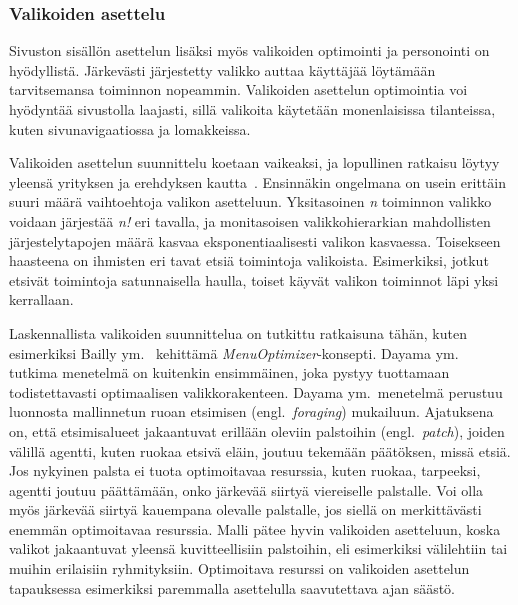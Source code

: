 \documentclass[finnish, 12pt, a4paper, elec, utf8, a-1b]{aaltothesis}
\begin{document}
\subsubsection{Valikoiden asettelu}\label{menu-personalization}

Sivuston sisällön asettelun lisäksi myös valikoiden optimointi ja personointi on
hyödyllistä. Järkevästi järjestetty valikko auttaa käyttäjää löytämään
tarvitsemansa toiminnon nopeammin. Valikoiden asettelun optimointia voi
hyödyntää sivustolla laajasti, sillä valikoita käytetään monenlaisissa
tilanteissa, kuten sivunavigaatiossa ja lomakkeissa.

Valikoiden asettelun suunnittelu koetaan vaikeaksi, ja lopullinen ratkaisu
löytyy yleensä yrityksen ja erehdyksen kautta~\cite{10.1145/2501988.2502024}.
Ensinnäkin ongelmana on usein erittäin suuri määrä vaihtoehtoja valikon
asetteluun. Yksitasoinen \textit{n} toiminnon valikko voidaan järjestää
\textit{n!} eri tavalla, ja monitasoisen valikkohierarkian mahdollisten
järjestelytapojen määrä kasvaa eksponentiaalisesti valikon kasvaessa. Toisekseen
haasteena on ihmisten eri tavat etsiä toimintoja valikoista. Esimerkiksi, jotkut
etsivät toimintoja satunnaisella haulla, toiset käyvät valikon toiminnot läpi
yksi kerrallaan.

Laskennallista valikoiden suunnittelua on tutkittu ratkaisuna tähän, kuten
esimerkiksi Bailly ym.~\cite{10.1145/2501988.2502024} kehittämä
\textit{MenuOptimizer}-konsepti. Dayama ym.~\cite{DAYAMA2021102624} tutkima
menetelmä on kuitenkin ensimmäinen, joka pystyy tuottamaan todistettavasti
optimaalisen valikkorakenteen. Dayama ym.~menetelmä perustuu luonnosta
mallinnetun ruoan etsimisen (engl.~\textit{foraging}) mukailuun. Ajatuksena on,
että etsimisalueet jakaantuvat erillään oleviin palstoihin
(engl.~\textit{patch}), joiden välillä agentti, kuten ruokaa etsivä eläin,
joutuu tekemään päätöksen, missä etsiä. Jos nykyinen palsta ei tuota
optimoitavaa resurssia, kuten ruokaa, tarpeeksi, agentti joutuu päättämään, onko
järkevää siirtyä viereiselle palstalle. Voi olla myös järkevää siirtyä kauempana
olevalle palstalle, jos siellä on merkittävästi enemmän optimoitavaa resurssia.
Malli pätee hyvin valikoiden asetteluun, koska valikot jakaantuvat yleensä
kuvitteellisiin palstoihin, eli esimerkiksi välilehtiin tai muihin erilaisiin
ryhmityksiin. Optimoitava resurssi on valikoiden asettelun tapauksessa
esimerkiksi paremmalla asettelulla saavutettava ajan säästö.
\end{document}
